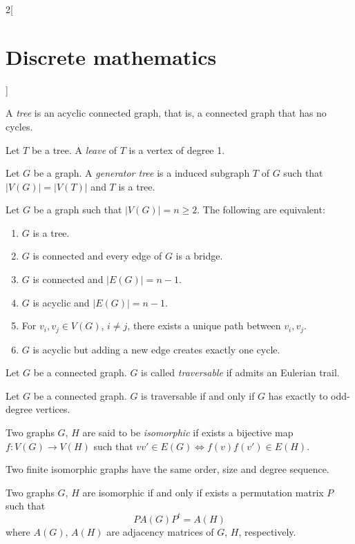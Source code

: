 \documentclass[../../../main.tex]{subfiles}
\begin{document}
\begin{multicols}{2}[\section{Discrete mathematics}]
\begin{prop}
\begin{enumerate}
\end{enumerate}
\end{prop}
\begin{definition}
A \textit{tree} is an acyclic connected graph, that is, a connected graph that has no cycles.
\end{definition}
\begin{definition}
Let $T$ be a tree. A \textit{leave} of $T$ is a vertex of degree 1.
\end{definition}
\begin{definition}
Let $G$ be a graph. A \textit{generator tree} is a induced subgraph $T$ of $G$ such that $|V(G)|=|V(T)|$ and $T$ is a tree.
\end{definition}
\begin{prop}
Let $G$ be a graph such that $|V(G)|=n\geq 2$. The following are equivalent:
\begin{enumerate}
    \item $G$ is a tree.
    \item $G$ is connected and every edge of $G$ is a bridge.
    \item $G$ is connected and $|E(G)|=n-1$.
    \item $G$ is acyclic and $|E(G)|=n-1$.
    \item For $v_i,v_j\in V(G)$, $i\ne j$, there exists a unique path between $v_i,v_j$. 
    \item $G$ is acyclic but adding a new edge creates exactly one cycle.
\end{enumerate}
\end{prop}
\begin{definition}
Let $G$ be a connected graph. $G$ is called \textit{traversable} if admits an Eulerian trail.
\end{definition}
\begin{theorem}
Let $G$ be a connected graph. $G$ is traversable if and only if $G$ has exactly to odd-degree vertices.
\end{theorem}
\begin{definition}
Two graphs $G$, $H$ are said to be \textit{isomorphic} if exists a bijective map $f:V(G)\rightarrow V(H)$ such that $vv'\in E(G)\iff f(v)f(v')\in E(H)$.
\end{definition}
\begin{prop}
Two finite isomorphic graphs have the same order, size and degree sequence.
\end{prop}
\begin{theorem}
Two graphs $G$, $H$ are isomorphic if and only if exists a permutation matrix $P$ such that $$PA(G)P^t=A(H)$$ where $A(G)$, $A(H)$ are adjacency matrices of $G$, $H$, respectively.
\end{theorem}

\end{multicols}
\end{document}
